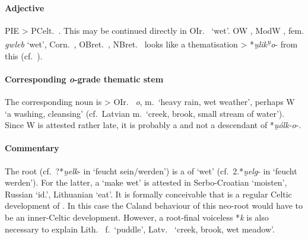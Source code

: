 \documentclass[output=paper,colorlinks,citecolor=brown]{langscibook}
\begin{document}
\paragraph*{Adjective}

PIE  > PCelt.\ . This may be continued directly in OIr.\   ‘wet’. OW , ModW , fem. \textit{gwleb} ‘wet’, Corn.\ , OBret.\ , NBret.\  looks like a thematisation  > *\textit{u̯lik\textsuperscript{u̯}o}- from this (cf.\ \citealt{Kummel2022}).

\paragraph*{Corresponding \textit{o}-grade thematic stem}

The corresponding noun is  > OIr.\   \textit{o}, m.\ ‘heavy rain, wet weather’, perhaps W  ‘a washing, cleansing’ (cf.\ Latvian  m.\ ‘creek, brook, small stream of water’). Since W  is attested rather late, it is probably a  and not a descendant of *\textit{u̯ólk\nobreakdash-o}-.

\paragraph*{Commentary} 

The root  (cf.\ ?*\textit{u̯elk}- in  ‘feucht sein/werden’) is a  of  ‘wet’ (cf.\ 2.*\textit{u̯elg}- in  ‘feucht werden’). For the latter, a   ‘make wet’ is attested in Serbo-Croatian  ‘moisten’, Russian  ‘id.’, Lithuanian  ‘eat’. It is formally conceivable that  is a regular Celtic development of . In this case the Caland behaviour  of this neo-root  would have to be an inner-Celtic development. However, a root-final voiceless *\textit{k} is also necessary to explain Lith.\  f.\ ‘puddle’, Latv.\  ‘creek, brook, wet meadow’.
\end{document}
